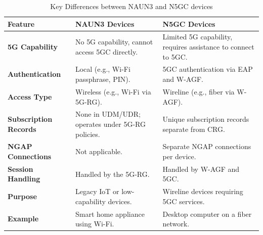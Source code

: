 \begin{table}[ht]
    \centering
    \caption{Key Differences between \ac{NAUN3} and \ac{N5GC} devices}
    \label{tab:Key Differences between NAUN3 and N5GC devices}
    \begin{tabularx}{\textwidth} {
            | >{\raggedright\arraybackslash}X
            | >{\raggedright\arraybackslash}X
            | >{\raggedright\arraybackslash}X |}
        \hline
        \textbf{Feature}               & \textbf{\ac{NAUN3} Devices}                                    & \textbf{\ac{N5GC} Devices}                                              \\
        \hline
        \textbf{\ac{5G} Capability}    & No \ac{5G} capability, cannot access \ac{5GC} directly.        & Limited \ac{5G} capability, requires assistance to connect to \ac{5GC}. \\
        \hline
        \textbf{Authentication}        & Local (e.g., Wi-Fi passphrase, \ac{PIN}).                      & \ac{5GC} authentication via \ac{EAP} and \ac{W-AGF}.                    \\
        \hline
        \textbf{Access Type}           & Wireless (e.g., Wi-Fi via \ac{5G-RG}).                         & Wireline (e.g., fiber via \ac{W-AGF}).                                  \\
        \hline
        \textbf{Subscription Records}  & None in \ac{UDM}/\ac{UDR}; operates under \ac{5G-RG} policies. & Unique subscription records separate from \ac{CRG}.                     \\
        \hline
        \textbf{\ac{NGAP} Connections} & Not applicable.                                                & Separate \ac{NGAP} connections per device.                              \\
        \hline
        \textbf{Session Handling}      & Handled by the \ac{5G-RG}.                                     & Handled by \ac{W-AGF} and \ac{5GC}.                                     \\
        \hline
        \textbf{Purpose}               & Legacy \ac{IoT} or low-capability devices.                     & Wireline devices requiring \ac{5GC} services.                           \\
        \hline
        \textbf{Example}               & Smart home appliance using Wi-Fi.                              & Desktop computer on a fiber network.                                    \\
        \hline
    \end{tabularx}
\end{table}

